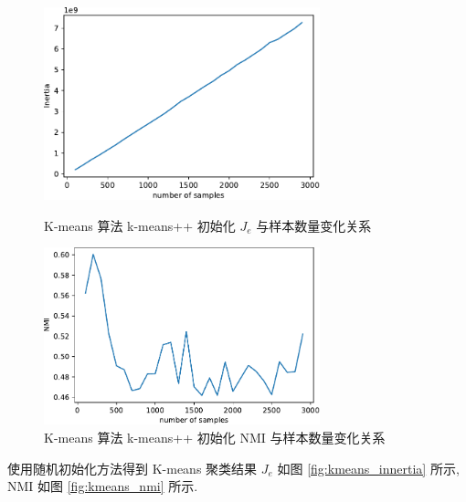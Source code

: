 \documentclass{article}
\begin{document}
\begin{figure}[htbp]
  \centering
  \begin{minipage}[t]{0.48\textwidth}
    \centering
    \includegraphics[width=8cm]{kmeans_innertia_pp.pdf}
    \caption{K-means 算法 k-means++ 初始化 $J_e$ 与样本数量变化关系}
    \label{fig:kmeans_innertia_pp}
  \end{minipage}
  \begin{minipage}[t]{0.48\textwidth}
    \centering
    \includegraphics[width=8cm]{kmeans_nmi_pp.pdf}
    \caption{K-means 算法 k-means++ 初始化 NMI 与样本数量变化关系}
    \label{fig:kmeans_nmi_pp}
  \end{minipage}
\end{figure}

使用随机初始化方法得到 K-means 聚类结果 $J_e$ 如图 \ref{fig:kmeans_innertia}  所示, NMI 如图 \ref{fig:kmeans_nmi} 所示.
\end{document}
